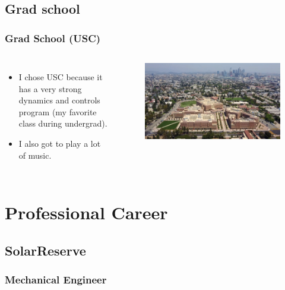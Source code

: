 \documentclass[aspectratio=169]{beamer}
\begin{document}
\subsection{Grad school}
\begin{frame}
  \frametitle{Grad School (USC)}
  \begin{columns}[t]
  \begin{itemize}
  \item I chose USC because it has a very strong dynamics and controls
    program (my favorite class during undergrad).
  \item I also got to play a lot of music.
  \end{itemize}

  \begin{figure}
    \includegraphics[width=0.7\linewidth]{USC.jpg}
  \end{figure}
  \end{columns}
\end{frame}

\section{Professional Career}



\subsection{SolarReserve}
\subsubsection{Mechanical Engineer}
\end{document}
